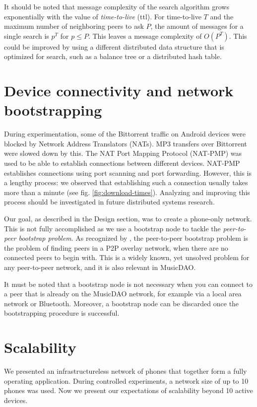 It should be noted that message complexity of the search algorithm grows exponentially with the value of \textit{time-to-live} (ttl). For time-to-live $T$ and the maximum number of neighboring peers to ask $P$, the amount of messages for a single search is $p^T$ for $p\leq P$. This leaves a message complexity of $O(P^T)$. This could be improved by using a different distributed data structure that is optimized for search, such as a balance tree or a distributed hash table. 

\section{Device connectivity and network bootstrapping}
During experimentation, some of the Bittorrent traffic on Android devices were blocked by Network Address  Translators (NATs). MP3 transfers over Bittorrent were slowed down by this. The NAT Port Mapping Protocol (NAT-PMP) was used to be able to establish connections between different devices. NAT-PMP establishes connections using port scanning and port forwarding. However, this is a lengthy process: we observed that establishing such a connection usually takes more than a minute (see fig. \ref{fig:download-times}). Analyzing and improving this process should be investigated in future distributed systems research.

Our goal, as described in the Design section, was to create a phone-only network. This is not fully accomplished as we use a bootstrap node to tackle the \textit{peer-to-peer bootstrap problem}. As recognized by \cite{wolinsky2010addressing}, the peer-to-peer bootstrap problem is the problem of finding peers in a P2P overlay network, when there are no connected peers to begin with. This is a widely known, yet unsolved problem for any peer-to-peer network, and it is also relevant in MusicDAO. 

It must be noted that a bootstrap node is not necessary when you can connect to a peer that is already on the MusicDAO network, for example via a local area network or Bluetooth. Moreover, a bootstrap node can be discarded once the bootstrapping procedure is successful.

\section{Scalability}
We presented an infrastructureless network of phones that together form a fully operating application. During controlled experiments, a network size of up to 10 phones was used. Now we present our expectations of scalability beyond 10 active devices. 


